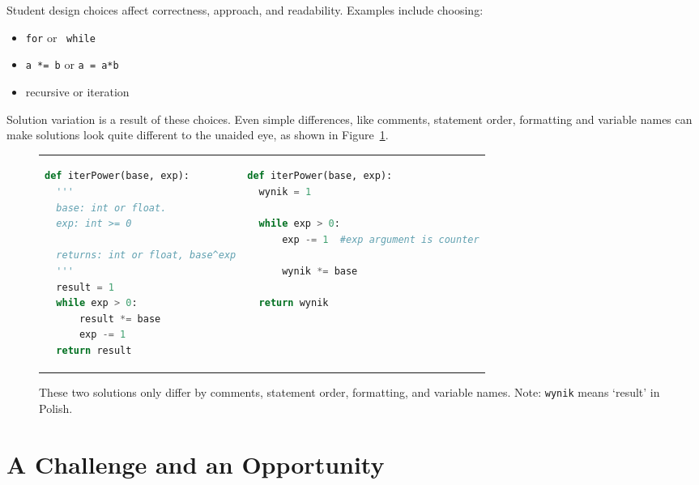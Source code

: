Student design choices affect correctness, approach, and readability. Examples include choosing:
\begin{itemize} 
\item \texttt{for} or ~\texttt{while}
\item \texttt{a *= b} or \texttt{a = a*b}
\item recursive or iteration 
\end{itemize}
Solution variation is a result of these choices. Even simple differences, like comments, statement order, formatting and variable names can make solutions look quite different to the unaided eye, as shown in Figure~\ref{table:difflook}.

\begin{figure}
\begin{tabular}{ll}
\begin{minipage}{0.5\linewidth}
\begin{lstlisting}[basicstyle=\linespread{1.0}\ttfamily\footnotesize,language=python]
def iterPower(base, exp):
  '''
  base: int or float.
  exp: int >= 0

  returns: int or float, base^exp
  '''
  result = 1
  while exp > 0:
      result *= base
      exp -= 1
  return result
\end{lstlisting}
\end{minipage}
& 

\begin{minipage}{1.0\linewidth}
\begin{lstlisting}[basicstyle=\linespread{1.0}\ttfamily\footnotesize,language=python]
def iterPower(base, exp):
  wynik = 1

  while exp > 0:
      exp -= 1  #exp argument is counter

      wynik *= base

  return wynik
\end{lstlisting}
\end{minipage} 
\end{tabular}
\caption{These two solutions only differ by comments, statement order, formatting, and variable names. Note: \texttt{wynik} means `result' in Polish.}
\label{table:difflook}
\end{figure}

\section{A Challenge and an Opportunity}


